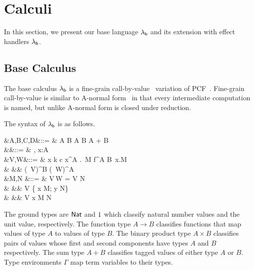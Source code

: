 \documentclass[12pt,phd,lfcs,twoside,openright,logo,leftchapter,normalheadings]{infthesis}
\theoremstyle{plain}
\theoremstyle{definition}
\begin{document}
\section{Calculi}
\label{sec:calculi}
In this section, we present our base language $\lambda_{\mathsf{b}}$ and its
extension with effect handlers $\lambda_{\mathsf{h}}$.

\subsection{Base Calculus}
The base calculus $\lambda_{\mathsf{b}}$ is a fine-grain
call-by-value~\cite{LevyPT03} variation of PCF~\cite{Plotkin77}.
%
Fine-grain call-by-value is similar to A-normal
form~\cite{FlanaganSDF93} in that every intermediate computation is
named, but unlike A-normal form is closed under reduction.

The syntax of $\lambda_{\mathsf{b}}$ is as follows.
{\small
\noindent
  \begin{syntax}
              &A,B,C,D\in\TypeCat  &::= & \Nat \mid \One \mid A \to B \mid A \times B \mid A + B \\
     &\Gamma\in\CtxCat &::= & \cdot \mid \Gamma, x:A \\
        &V,W\in\ValCat  &::= & x \mid k \mid c \mid \lambda x^A .\, M \mid \Rec \; f^{A \to B}\, x.M \\
                     &               &\mid& \Unit \mid {} \mid (\Inl\, V)^B \mid (\Inr\, W)^A\\
  &M,N\in\CompCat
                           &::= & V\,W
                            \mid  \Let\;  = V \; \In \; N \\
                     &     &\mid&\Case \; V \;\{ \Inl \; x \mapsto M; \Inr \; y \mapsto N\}\\
                     &    &\mid& \Return\; V
                           \mid \Let \; x \revto M \; \In \; N \\
\end{syntax}}%
%
The ground types are $\mathsf{Nat}$ and $1$ which classify natural number
values and the unit value, respectively. The function type $A \to B$
classifies functions that map values of type $A$ to values of type
$B$. The binary product type $A \times B$ classifies pairs of values
whose first and second components have types $A$ and $B$
respectively. The sum type $A + B$ classifies tagged values of either
type $A$ or $B$.
%
Type environments $\Gamma$ map term variables to their types.
\end{document}
